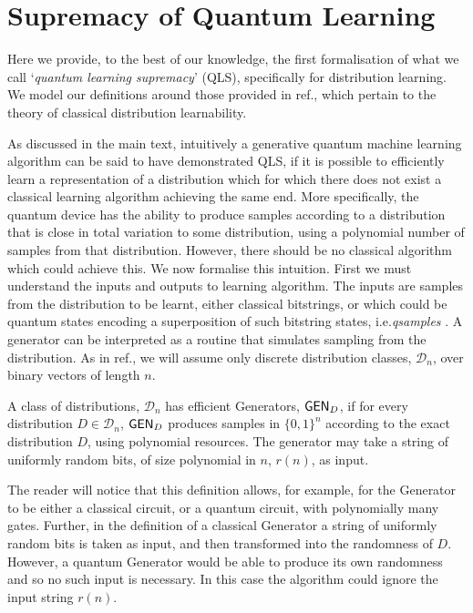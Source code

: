 \section{Supremacy of Quantum Learning}
\label{supp_mat:superioritydefinitions}

Here we provide, to the best of our knowledge, the first formalisation of what we call `\textit{quantum learning supremacy}' (QLS), specifically for distribution learning. We model our definitions around those provided in ref., which pertain to the theory of classical distribution learnability. 

As discussed in the main text, intuitively a generative quantum machine learning algorithm can be said to have demonstrated QLS, if it is possible to efficiently learn a representation of a distribution which for which there does not exist a classical learning algorithm achieving the same end. More specifically, the quantum device has the ability to produce samples according to a distribution that is close in total variation to some distribution, using a polynomial number of samples from that distribution. However, there should be no classical algorithm which could achieve this. 
We now formalise this intuition. First we must understand the inputs and outputs to learning algorithm. The inputs are samples from the distribution to be learnt, either classical bitstrings, or which could be quantum states encoding a superposition of such bitstring states, i.e.\@ \textit{qsamples} . A generator can be interpreted as a routine that simulates sampling from the distribution. As in ref., we will assume only discrete distribution classes, $\mathcal{D}_n$, over binary vectors of length $n$.%

\begin{definition}\label{defn:generator_supp}
    A class of distributions, $\mathcal{D}_n$ has efficient Generators, $\operatorname{\textsf{GEN}}_{D}$, if for every distribution $D \in \mathcal{D}_n$, $\operatorname{\textsf{GEN}}_{D}$ produces samples in $\{0, 1\}^n$ according to the exact distribution $D$, using polynomial resources.
    The generator may take a string of uniformly random bits, of size polynomial in $n$, $r(n)$, as input.
\end{definition}

The reader will notice that this definition allows, for example, for the Generator to be either a classical circuit, or a quantum circuit, with polynomially many gates. Further, in the definition of a classical Generator  a string of uniformly random bits is taken as input, and then transformed into the randomness of $D$. However, a quantum Generator would be able to produce its own randomness and so no such input is necessary. In this case the algorithm could ignore the input string $r(n)$. 

